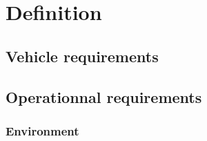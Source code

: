 \chapter{Definition}
\section{Vehicle requirements}








\section{Operationnal requirements}





\subsection{Environment}


